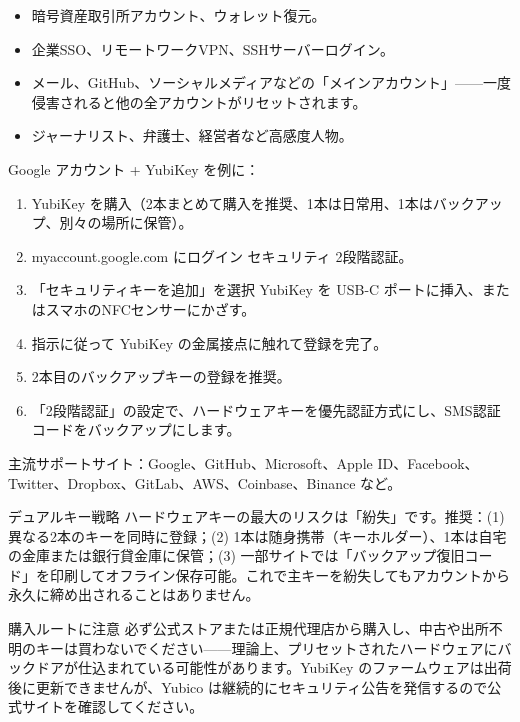 
\begin{itemize}
  \item 暗号資産取引所アカウント、ウォレット復元。
  \item 企業SSO、リモートワークVPN、SSHサーバーログイン。
  \item メール、GitHub、ソーシャルメディアなどの「メインアカウント」——一度侵害されると他の全アカウントがリセットされます。
  \item ジャーナリスト、弁護士、経営者など高感度人物。
\end{itemize}


Google アカウント + YubiKey を例に：

\begin{enumerate}
  \item YubiKey を購入（2本まとめて購入を推奨、1本は日常用、1本はバックアップ、別々の場所に保管）。
  \item myaccount.google.com にログイン セキュリティ 2段階認証。
  \item 「セキュリティキーを追加」を選択 YubiKey を USB-C ポートに挿入、またはスマホのNFCセンサーにかざす。
  \item 指示に従って YubiKey の金属接点に触れて登録を完了。
  \item 2本目のバックアップキーの登録を推奨。
  \item 「2段階認証」の設定で、ハードウェアキーを優先認証方式にし、SMS認証コードをバックアップにします。
\end{enumerate}

主流サポートサイト：Google、GitHub、Microsoft、Apple ID、Facebook、Twitter、Dropbox、GitLab、AWS、Coinbase、Binance など。

\begin{tcbinfo}{デュアルキー戦略}
ハードウェアキーの最大のリスクは「紛失」です。推奨：(1) 異なる2本のキーを同時に登録；(2) 1本は随身携帯（キーホルダー）、1本は自宅の金庫または銀行貸金庫に保管；(3) 一部サイトでは「バックアップ復旧コード」を印刷してオフライン保存可能。これで主キーを紛失してもアカウントから永久に締め出されることはありません。

\end{tcbinfo}

\begin{tcbwarn}{購入ルートに注意}
必ず公式ストアまたは正規代理店から購入し、中古や出所不明のキーは買わないでください——理論上、プリセットされたハードウェアにバックドアが仕込まれている可能性があります。YubiKey のファームウェアは出荷後に更新できませんが、Yubico は継続的にセキュリティ公告を発信するので公式サイトを確認してください。

\end{tcbwarn}

